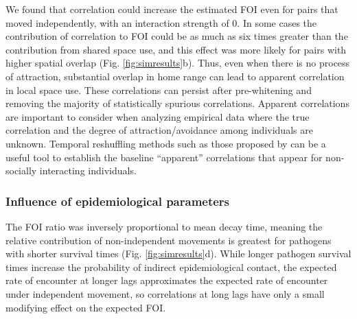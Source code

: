 \documentclass[letterpaper]{article}
\begin{document}
We found that correlation could increase the estimated FOI even for pairs that moved independently, with an interaction strength of 0. In some cases the contribution of correlation to FOI could be as much as six times greater than the contribution from shared space use, and this effect was more likely for pairs with higher spatial overlap (Fig. \ref{fig:simresults}b). %
Thus, even when there is no process of attraction, substantial overlap in home range can lead to apparent correlation in local space use.%
These correlations can persist after pre-whitening and removing the majority of statistically spurious correlations. Apparent correlations are important to consider when analyzing empirical data where the true correlation and the degree of attraction/avoidance among individuals are unknown. Temporal reshuffling methods such as those proposed by \citet{Spiegel2016} can be a useful tool to establish the baseline ``apparent'' correlations that appear for non-socially interacting individuals. 

\subsubsection*{Influence of epidemiological parameters}

The FOI ratio was inversely proportional to mean decay time, meaning the relative contribution of non-independent movements is greatest for pathogens with shorter survival times (Fig. \ref{fig:simresults}d). While longer pathogen survival times increase the probability of indirect epidemiological contact, the expected rate of encounter at longer lags approximates the expected rate of encounter under independent movement, so correlations at long lags have only a small modifying effect on the expected FOI. %
\end{document}
